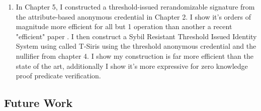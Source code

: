 \begin{enumerate}
    \item In Chapter 5, I constructed a threshold-issued rerandomizable signature from the attribute-based anonymous credential in Chapter 2. I show it's orders of magnitude more efficient for all but 1 operation than another a recent "efficient" paper \cite{rabaninejad_attribute-based_2024}. I then construct a Sybil Resistant Threshold Issued Identity System using called T-Siris using the threshold anonymous credential and the nullifier from chapter 4. I show my construction is far more efficient than the state of the art, additionally I show it's more expressive for zero knowledge proof predicate verification. 
    
\end{enumerate}



\subsection{Future Work}